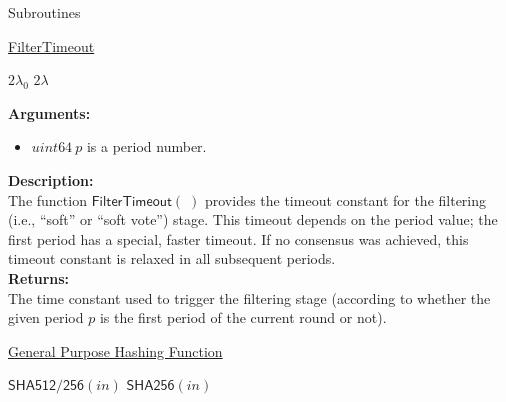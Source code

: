 \documentclass[10pt,a4paper]{article}
\begin{document}
\begin{section}{Subroutines}\label{sect:soubroutines}


\begin{algorithm}[H]
    \caption{\underline{FilterTimeout}}
    \label{algo:filter-timeout}
    \begin{algorithmic}[1]
            \Return $2\lambda_0$
        \Else 
            \Return $2\lambda$
        \EndIf
    \EndFunction
    \end{algorithmic}
\end{algorithm}

\noindent \textbf{Arguments:}
\begin{itemize}
    \item $uint64 \ p$ is a period number.
  \end{itemize}

\noindent \textbf{Description:}\\
The function $\mathsf{FilterTimeout}(\;)$ provides the timeout 
constant for the filtering (i.e., ``soft'' or ``soft vote'') stage.
This timeout depends on the period value; the first period has a special, faster timeout.
If no consensus was achieved, this timeout constant is relaxed in all subsequent periods.\\ 

\noindent \textbf{Returns:}\\
The time constant used to trigger the filtering stage (according to whether the given
    period $p$ is the first period of the current round or not).


\begin{algorithm}[H]
    \caption{\underline{General Purpose Hashing Function}}
    \begin{algorithmic}[1]
            \Return $\mathsf{SHA512/256}(in)$
        \Else
            \Return $\mathsf{SHA256}(in)$
        \EndIf
    \EndFunction
    \end{algorithmic}
\end{algorithm}


\end{section}
\end{document}
